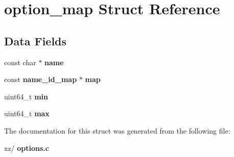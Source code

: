 \section{option\+\_\+map Struct Reference}
\label{structoption__map}
\subsection*{Data Fields}
\begin{DoxyCompactItemize}
\item 
\mbox{\label{structoption__map_ad35da6b28ae48a69f7dd76ea7971b869}} 
const char $\ast$ {\bfseries name}
\item 
\mbox{\label{structoption__map_ae591a7f07dfec117adc89e7e6d7393ad}} 
const \textbf{ name\+\_\+id\+\_\+map} $\ast$ {\bfseries map}
\item 
\mbox{\label{structoption__map_a178e75dba6d1afbe9edd86c89cfa2a58}} 
uint64\+\_\+t {\bfseries min}
\item 
\mbox{\label{structoption__map_a8a94842dae4a51597fd13fdfcc0c660c}} 
uint64\+\_\+t {\bfseries max}
\end{DoxyCompactItemize}


The documentation for this struct was generated from the following file\+:\begin{DoxyCompactItemize}
\item 
xz/\textbf{ options.\+c}\end{DoxyCompactItemize}

